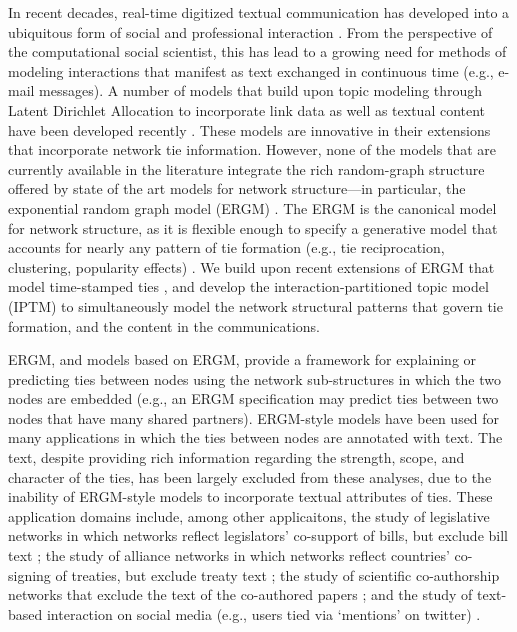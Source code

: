 In recent decades, real-time digitized textual communication has developed into a ubiquitous form of social and professional interaction \citep[see, e.g.,][]{kanungo2008modeling, szostek2011dealing, burgess2004email, pew2016}. From the perspective of the computational social scientist, this has lead to a growing need for methods of modeling interactions that manifest as text exchanged in continuous time (e.g., e-mail messages). A number of models that build upon topic modeling through Latent Dirichlet Allocation \citep{Blei2003} to incorporate link data as well as textual content have been developed recently \citep{mccallum2005author,lim2013twitter,Krafft2012}. These models are innovative in their extensions that incorporate network tie information. However, none of the models that are currently available in the literature integrate the rich random-graph structure offered by state of the art models for network structure---in particular, the exponential random graph model (ERGM) \citep{robins2007introduction,chatterjee2013estimating,hunter2008ergm}. The ERGM is the canonical model for network structure, as it is flexible enough to specify a generative model that accounts for nearly any pattern of tie formation (e.g., tie reciprocation, clustering, popularity effects) \citep{desmarais2017statistical}. We build upon recent extensions of ERGM that model time-stamped ties \citep{PerryWolfe2012,Butts2008}, and develop the interaction-partitioned topic model (IPTM) to simultaneously model the network structural patterns that govern tie formation, and the content in the communications.

ERGM, and models based on ERGM, provide a framework for explaining or predicting ties between nodes using the network sub-structures in which the two nodes are embedded (e.g., an ERGM specification may predict ties between two nodes that have many shared partners). ERGM-style models have been used for many applications in which the ties between nodes are annotated with text. The text, despite providing rich information regarding the strength, scope, and character of the ties, has been largely excluded from these analyses, due to the inability of ERGM-style models to incorporate textual attributes of ties. These application domains include, among other applicaitons, the study of legislative networks in which networks reflect legislators' co-support of bills, but exclude bill text \citep{bratton2011networks,aleman2013explaining}; the study of alliance networks in which networks reflect countries' co-signing of treaties, but exclude treaty text \citep{camber2010geometry,cranmer2012complex,cranmer2012toward,kinne2016agreeing}; the study of scientific co-authorship networks that exclude the text of the co-authored papers \citep{kronegger2011collaboration,liang2015changing,fahmy2016gender}; and the study of text-based interaction on social media (e.g., users tied via `mentions' on twitter) \citep{yoon2014strategies,peng2016follower,lai2017connecting}.

